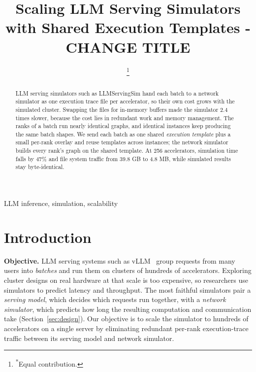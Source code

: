\documentclass[conference]{IEEEtran}
\begin{document}
\title{Scaling LLM Serving Simulators with Shared Execution Templates - CHANGE TITLE}

\author{
\and
{}
\thanks{\textsuperscript{*}Equal contribution.}
}


\maketitle

\begin{abstract}
LLM serving simulators such as LLMServingSim hand each batch to a network
simulator as one execution trace file per accelerator, so their own cost
grows with the simulated cluster. Swapping the files for in-memory buffers
made the simulator 2.4 times slower, because the cost lies in redundant
work and memory management. The ranks of a batch run nearly identical
graphs, and identical instances keep producing the same batch shapes. We
send each batch as one shared \emph{execution template} plus a small
per-rank overlay and reuse templates across instances; the network
simulator builds every rank's graph on the shared template. At 256
accelerators, simulation time falls by 47\% and file system traffic from
39.8 GB to 4.8 MB, while simulated results stay byte-identical.
\end{abstract}

\begin{IEEEkeywords}
LLM inference, simulation, scalability
\end{IEEEkeywords}

\section{Introduction}

\textbf{Objective.} LLM serving systems such as vLLM~\cite{vllm} group
requests from many users into \emph{batches} and run them on clusters of
hundreds of accelerators. Exploring cluster designs on real hardware at
that scale is too expensive, so researchers use
simulators to predict latency and throughput. The most faithful
simulators pair a \emph{serving model}, which decides which requests run
together, with a \emph{network simulator}, which predicts how long the
resulting computation and communication take
(Section~\ref{sec:design}). Our objective is to scale the simulator to hundreds of accelerators on a single server by eliminating redundant per-rank execution-trace traffic between its serving model and network simulator.
\end{document}
